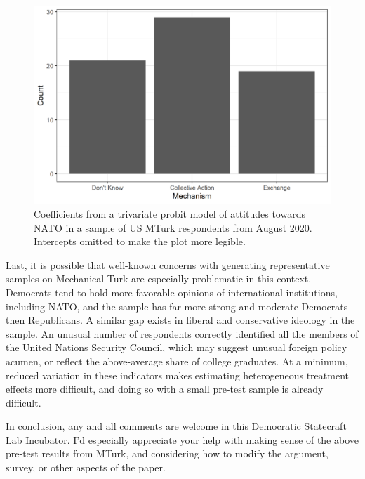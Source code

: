 \documentclass[12pt]{article}
\begin{document}
\begin{figure}
\includegraphics[width = .95\textwidth]{../figures/neutral-mech.png} 
\caption{Coefficients from a trivariate probit model of attitudes towards NATO in a sample of US MTurk respondents from August 2020. Intercepts omitted to make the plot more legible.}
\label{fig:neutral-mech} 
\end{figure} 


Last, it is possible that well-known concerns with generating representative samples on Mechanical Turk are especially problematic in this context. 
Democrats tend to hold more favorable opinions of international institutions, including NATO, and the sample has far more strong and moderate Democrats then Republicans.
A similar gap exists in liberal and conservative ideology in the sample. 
An unusual number of respondents correctly identified all the members of the United Nations Security Council, which may suggest unusual foreign policy acumen, or reflect the above-average share of college graduates. 
At a minimum, reduced variation in these indicators makes estimating heterogeneous treatment effects more difficult, and doing so with a small pre-test sample is already difficult. 


In conclusion, any and all comments are welcome in this Democratic Statecraft Lab Incubator. 
I'd especially appreciate your help with making sense of the above pre-test results from MTurk, and considering how to modify the argument, survey, or other aspects of the paper. 


\newpage

\singlespace
 
 
\end{document}
